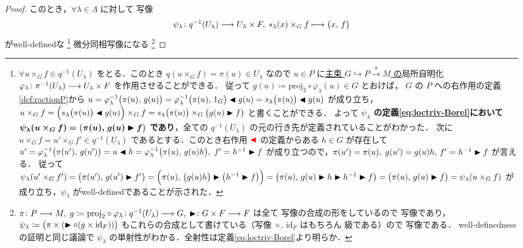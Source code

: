 \documentclass[geometry_main]{subfiles}
\begin{document}
\begin{proof}
    このとき，$\forall \lambda \in \Lambda$ に対して \cinfty 写像
    \begin{align}
        \label{eq:loctriv-Borel}
        \psi_\lambda \colon q^{-1}(U_\lambda) \longrightarrow U_\lambda \times F,\; s_\lambda(x) \times_G f \longmapsto \bigl( x,\, f \bigr) 
    \end{align}
    がwell-definedな
    \footnote{$\forall u \times_G f \in q^{-1}(U_\lambda)$ をとる．このとき $q(u \times_G f) = \pi(u) \in U_\lambda$ なので $u \in P$ に\underline{主束 $G \hookrightarrow P \xrightarrow{\pi} M$ の}局所自明化 $\varphi_\lambda \colon \pi^{-1}(U_\lambda) \longrightarrow U_\lambda \times F$ を作用させることができる．
        従って $g(u) \coloneqq  \mathrm{proj}_2 \circ \varphi_\lambda (u) \in G$ とおけば，
        $G$ の $P$ への右作用の定義\eqref{def:ractionP}から $u = \varphi_\lambda^{-1} \bigl(\pi(u),\, g(u)\bigr) = \varphi_\lambda^{-1} \bigl( \pi(u),\, 1_G \bigr)  \blacktriangleleft g(u) = s_\lambda \bigl( \pi(u) \bigr)  \blacktriangleleft g(u)$ が成り立ち，$u \times_G f = \Bigl( s_\lambda \bigl( \pi(u) \bigr) \blacktriangleleft g(u) \Bigr) \times_G f =  s_\lambda \bigl( \pi(u) \bigr) \times_G \bigl(g(u) \blacktriangleright f\bigr)$ と書くことができる．
        よって \textbf{$\psi_\lambda$ の定義\eqref{eq:loctriv-Borel}において} $\bm{\psi_\lambda (u \times_G f) = \bigl( \pi(u),\, g(u) \blacktriangleright f \bigr)}$ \textbf{であり}，全ての $q^{-1}(U_\lambda)$ の元の行き先が定義されていることがわかった．
        次に $u \times_G f = u' \times_G f' \in q^{-1}(U_\lambda)$ であるとする．このとき右作用 $\textcolor{red}{\blacktriangleleft}$ の定義からある $h \in G$ が存在して $u' = \varphi_\lambda^{-1} \bigl( \pi(u'),\, g(u') \bigr) = u \blacktriangleleft h = \varphi_\lambda^{-1} \bigl( \pi(u),\, g(u) h \bigr),\; f' = h^{-1} \blacktriangleright f$ が成り立つので，$\pi(u') = \pi(u),\; g(u') = g(u)h,\, f' = h^{-1} \blacktriangleright f$ が言える．
        従って $\psi_\lambda(u' \times_G f') = \bigl( \pi(u'),\, g(u') \blacktriangleright f' \bigr) = \Bigl( \pi(u),\, \bigl(g(u) h\bigr) \blacktriangleright \bigl( h^{-1} \blacktriangleright f \bigr) \Bigr) = \bigl( \pi(u),\, g(u) \blacktriangleright h \blacktriangleright h^{-1} \blacktriangleright f \bigr) = \bigl( \pi(u),\, g(u) \blacktriangleright f \bigr) = \psi_\lambda (u \times_G f)$ が成り立ち，$\psi_\lambda$ がwell-definedであることが示された．
    }
    微分同相写像になる
    \footnote{
        $\pi \colon P \longrightarrow M,\; g \coloneqq \mathrm{proj}_2 \circ \varphi_\lambda \colon q^{-1}(U_\lambda) \longrightarrow G,\; \blacktriangleright \colon G \times F \longrightarrow F$ は全て \cinfty 写像の合成の形をしているので \cinfty 写像であり，$\psi_\lambda \coloneqq \bigl(\pi \times (\blacktriangleright \circ (g \times \mathrm{id}_F))\bigr)$ もこれらの合成として書けている（写像 $\times,\, \mathrm{id}_F$ はもちろん \cinfty 級である）ので \cinfty 写像である．
        well-definednessの証明と同じ議論で $\psi_\lambda$ の単射性がわかる．全射性は定義\eqref{eq:loctriv-Borel}より明らか．
}
\end{proof}
\end{document}
